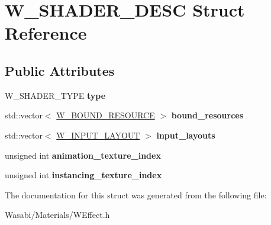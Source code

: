\hypertarget{struct_w___s_h_a_d_e_r___d_e_s_c}{}\section{W\+\_\+\+S\+H\+A\+D\+E\+R\+\_\+\+D\+E\+SC Struct Reference}
\label{struct_w___s_h_a_d_e_r___d_e_s_c}
\subsection*{Public Attributes}
\begin{DoxyCompactItemize}
\item 
W\+\_\+\+S\+H\+A\+D\+E\+R\+\_\+\+T\+Y\+PE {\bfseries type}\hypertarget{struct_w___s_h_a_d_e_r___d_e_s_c_ad7b83db0ce3b5eb747a0fea76b52acd5}{}\label{struct_w___s_h_a_d_e_r___d_e_s_c_ad7b83db0ce3b5eb747a0fea76b52acd5}

\item 
std\+::vector$<$ \hyperlink{struct_w___b_o_u_n_d___r_e_s_o_u_r_c_e}{W\+\_\+\+B\+O\+U\+N\+D\+\_\+\+R\+E\+S\+O\+U\+R\+CE} $>$ {\bfseries bound\+\_\+resources}\hypertarget{struct_w___s_h_a_d_e_r___d_e_s_c_aa3fea1cc775493c0fe9590129f91df63}{}\label{struct_w___s_h_a_d_e_r___d_e_s_c_aa3fea1cc775493c0fe9590129f91df63}

\item 
std\+::vector$<$ \hyperlink{struct_w___i_n_p_u_t___l_a_y_o_u_t}{W\+\_\+\+I\+N\+P\+U\+T\+\_\+\+L\+A\+Y\+O\+UT} $>$ {\bfseries input\+\_\+layouts}\hypertarget{struct_w___s_h_a_d_e_r___d_e_s_c_a994385c2ccd44ff6b0879ac15ba035cd}{}\label{struct_w___s_h_a_d_e_r___d_e_s_c_a994385c2ccd44ff6b0879ac15ba035cd}

\item 
unsigned int {\bfseries animation\+\_\+texture\+\_\+index}\hypertarget{struct_w___s_h_a_d_e_r___d_e_s_c_ac1b40ff1facba393210a61aeb5a064ea}{}\label{struct_w___s_h_a_d_e_r___d_e_s_c_ac1b40ff1facba393210a61aeb5a064ea}

\item 
unsigned int {\bfseries instancing\+\_\+texture\+\_\+index}\hypertarget{struct_w___s_h_a_d_e_r___d_e_s_c_a23a05bd7613ca8b029f14e27130a7844}{}\label{struct_w___s_h_a_d_e_r___d_e_s_c_a23a05bd7613ca8b029f14e27130a7844}

\end{DoxyCompactItemize}


The documentation for this struct was generated from the following file\+:\begin{DoxyCompactItemize}
\item 
Wasabi/\+Materials/W\+Effect.\+h\end{DoxyCompactItemize}
